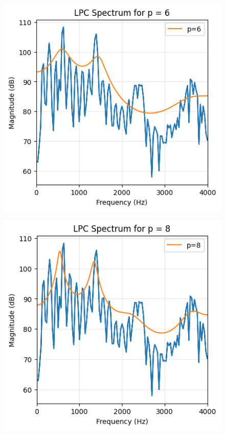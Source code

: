 \documentclass{article}
\begin{document}
\begin{figure}[H]
\begin{center}
\includegraphics[scale = 0.8]{6p.png}
\end{center}
\end{figure}

\begin{figure}[H]
\begin{center}
\includegraphics[scale = 0.8]{8p.png}
\end{center}
\end{figure}
\end{document}
